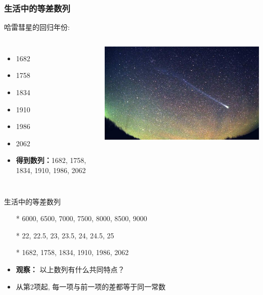 \documentclass[12pt]{beamer}
\begin{document}
	\begin{frame}[fragile]\frametitle{生活中的等差数列}

		哈雷彗星的回归年份:    
		\begin{columns}
				\begin{itemize}[<+- | +->]
					\item 1682
					\item 1758
					\item 1834
					\item 1910
					\item 1986
					\item 2062
					\item \textbf{得到数列：}1682, 1758, 1834, 1910, 1986, 2062
				\end{itemize}
				\includegraphics[width=\textwidth]{ap1.jpg}
		\end{columns}

	\end{frame}

	\begin{frame}{生活中的等差数列}
		\begin{itemize}
			\item[*] 6000, 6500, 7000, 7500, 8000, 8500, 9000 \vspace{15pt}
			\item[*] 22, 22.5, 23, 23.5, 24, 24.5, 25 \vspace{15pt}
			\item[*] 1682, 1758, 1834, 1910, 1986, 2062 
		\end{itemize}
		\pause
		\begin{itemize}[<+->]
			\item \textbf{观察：} 以上数列有什么共同特点？
			\item \alert{从第2项起}, 每一项与前一项的差都等于\alert{同一常数}
		\end{itemize}
	\end{frame}
\end{document}
